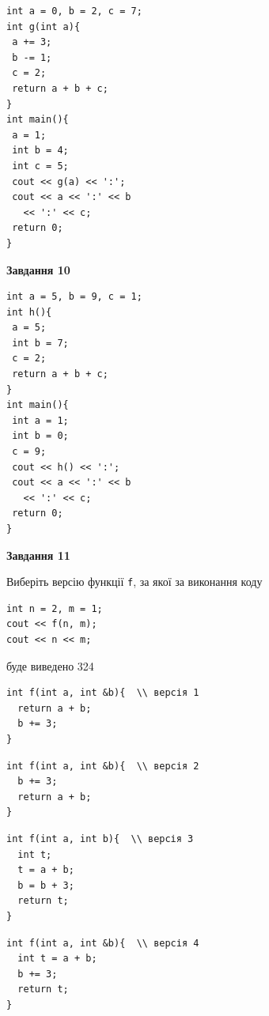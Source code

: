 \documentclass[12pt, ukrainian]{article}
\def\code#1{\Verb!#1!}
\begin{document}
{\begin {large}
\begin{minipage}[t]{7.0cm}
\begin{verbatim}
int a = 0, b = 2, c = 7;
int g(int a){
 a += 3;
 b -= 1;
 c = 2;
 return a + b + c;
}
int main(){
 a = 1;
 int b = 4;
 int c = 5;
 cout << g(a) << ':';
 cout << a << ':' << b 
   << ':' << c;
 return 0;
}
\end{verbatim}



\begin{center}
\textbf{Завдання 10}
\end{center}
\vspace{-8mm}

\begin{verbatim}
int a = 5, b = 9, c = 1;
int h(){
 a = 5;
 int b = 7;
 c = 2;
 return a + b + c;
}
int main(){
 int a = 1;
 int b = 0;
 c = 9;
 cout << h() << ':';
 cout << a << ':' << b 
   << ':' << c;
 return 0;
}
\end{verbatim}

\end{minipage}
\vline \hspace{1mm}
\begin{minipage}[t]{11.0cm}

\begin{center}
\textbf{Завдання 11}
\end{center}
Виберіть версію функції \code{f}, за якої за виконання коду
\begin{verbatim}
int n = 2, m = 1;
cout << f(n, m);
cout << n << m;
\end{verbatim}

буде виведено 324

\begin{verbatim}
int f(int a, int &b){  \\ версія 1
  return a + b;
  b += 3;
}
\end{verbatim}

\vspace{-8mm}\begin{verbatim}
int f(int a, int &b){  \\ версія 2
  b += 3;
  return a + b;
}
\end{verbatim}

\vspace{-8mm}\begin{verbatim}
int f(int a, int b){  \\ версія 3
  int t;
  t = a + b;
  b = b + 3;
  return t;
}
\end{verbatim}

\vspace{-8mm}\begin{verbatim}
int f(int a, int &b){  \\ версія 4
  int t = a + b;
  b += 3;
  return t;
}
\end{verbatim}




\end{minipage}
\end{large}}
\end{document}
